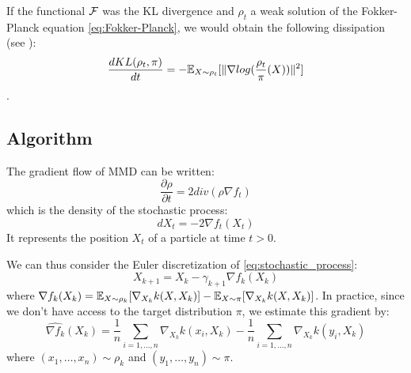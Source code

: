 \begin{remark}
	If the functional ${{\mathcal F}}$ was the KL divergence and $\rho_t$ a weak solution of the Fokker-Planck equation \eqref{eq:Fokker-Planck}, we would obtain the following dissipation (see \cite{wibisono2018sampling}):
	\begin{equation}
	\frac{d KL(\rho_t, \pi)}{dt}=-{{\mathbb E}}_{X \sim \rho_t}[\|\nabla log(\frac{\rho_t}{\pi}(X))\|^2]
	\end{equation}.
\end{remark}




\subsection{Algorithm}

The gradient flow of MMD can be written:
\begin{equation*}
\frac{\partial \rho}{\partial t}= 2 div(\rho  \nabla f_t)
\end{equation*}
which is the density of the stochastic process:
\begin{equation}\label{eq:stochastic_process}
dX_t=-2\nabla f_t(X_t) 
\end{equation}
It represents the position $X_t$ of a particle at time $t > 0$.


We can thus consider the Euler discretization of \eqref{eq:stochastic_process}:
\begin{equation}\label{eq:discretization}
X_{k+1}=X_k - \gamma_{k+1} \nabla f_k(X_k)
\end{equation}
where $\nabla f_k(X_k)= {{\mathbb E}}_{X \sim \rho_k}[\nabla_{X_k}k(X,X_k)] -  {{\mathbb E}}_{X \sim \pi}[\nabla_{X_k}k(X,X_k)]$.
In practice, since we don't have access to the target distribution $\pi$, we estimate this gradient by:
\begin{equation*}
\widehat{\nabla f_k}(X_k)=\frac{1}{n}\sum_{i=1,\dots,n}\nabla_{X_k}k(x_i,X_k) - \frac{1}{n}\sum_{i=1,\dots,n}\nabla_{X_k}k(y_i,X_k)
\end{equation*}
where $(x_1, \dots, x_n)\sim \rho_k$ and $(y_1, \dots, y_n)\sim \pi$.


